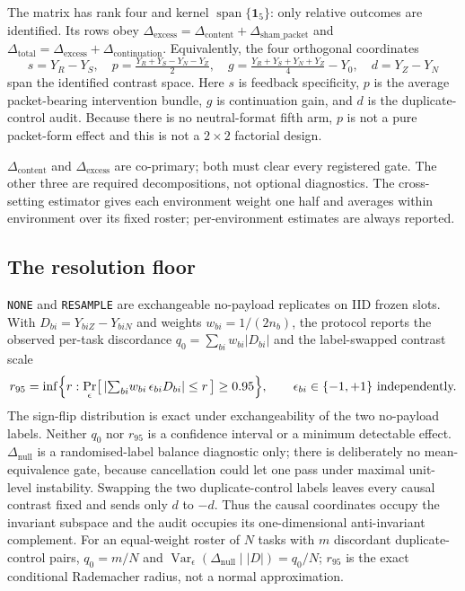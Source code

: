 \documentclass{article}
\begin{document}
The matrix has rank four and kernel $\operatorname{span}\{\mathbf 1_5\}$:
only relative outcomes are identified. Its rows obey
$\Delta_{\text{excess}}=\Delta_{\text{content}}+
\Delta_{\text{sham\_packet}}$ and
$\Delta_{\text{total}}=\Delta_{\text{excess}}+
\Delta_{\text{continuation}}$. Equivalently, the four orthogonal coordinates
\[
s=Y_R-Y_S,\quad p=\tfrac{Y_R+Y_S-Y_N-Y_Z}{2},\quad
g=\tfrac{Y_R+Y_S+Y_N+Y_Z}{4}-Y_0,\quad d=Y_Z-Y_N
\]
span the identified contrast space. Here $s$ is feedback specificity, $p$ is
the average packet-bearing intervention bundle, $g$ is continuation gain, and
$d$ is the duplicate-control audit. Because there is no neutral-format fifth
arm, $p$ is not a pure packet-form effect and this is not a $2\times2$
factorial design.

$\Delta_{\text{content}}$ and $\Delta_{\text{excess}}$ are co-primary; both must
clear every registered gate. The other three are required decompositions, not
optional diagnostics. The cross-setting estimator gives each environment weight
one half and averages within environment over its fixed roster; per-environment
estimates are always reported.

\subsection{The resolution floor}

\texttt{NONE} and \texttt{RESAMPLE} are exchangeable no-payload replicates on
IID frozen slots. With $D_{bi} = Y_{biZ} - Y_{biN}$ and weights
$w_{bi} = 1/(2n_b)$, the protocol reports the observed per-task discordance
$q_0 = \sum_{bi} w_{bi}|D_{bi}|$ and the label-swapped contrast scale
\[
    r_{95} = \inf\Bigl\{ r : \Pr_\epsilon\bigl[\, |{\textstyle\sum_{bi}} w_{bi}\,\epsilon_{bi} D_{bi}| \le r \,\bigr] \ge 0.95 \Bigr\},
    \qquad \epsilon_{bi} \in \{-1,+1\} \text{ independently.}
\]
The sign-flip distribution is exact under exchangeability of the two no-payload
labels. Neither $q_0$ nor $r_{95}$ is a confidence interval or a minimum
detectable effect. $\Delta_{\text{null}}$ is a randomised-label balance
diagnostic only; there is deliberately no mean-equivalence gate, because
cancellation could let one pass under maximal unit-level instability.
Swapping the two duplicate-control labels leaves every causal contrast fixed
and sends only $d$ to $-d$. Thus the causal coordinates occupy the invariant
subspace and the audit occupies its one-dimensional anti-invariant complement.
For an equal-weight roster of $N$ tasks with $m$ discordant duplicate-control
pairs, $q_0=m/N$ and
$\operatorname{Var}_{\epsilon}(\Delta_{\text{null}}\mid |D|)=q_0/N$; $r_{95}$
is the exact conditional Rademacher radius, not a normal approximation.
\end{document}
